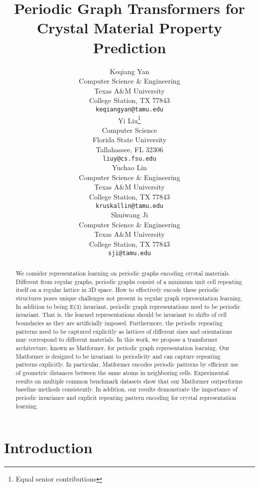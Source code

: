 \documentclass{article}
\title{Periodic Graph Transformers for Crystal Material Property Prediction}
\author{Keqiang Yan \\
 Computer Science \& Engineering\\
  Texas A\&M University\\
  College Station, TX 77843 \\
  \texttt{keqiangyan@tamu.edu} \\
  \And
  Yi Liu\thanks{Equal senior contributions} \\
  ~~~~~~~~~~~~~Computer Science~~~~~~~~~~~~~\\
  Florida State University\\
  Tallahassee, FL 32306 \\
  \texttt{liuy@cs.fsu.edu} \\
  \And
  Yuchao Lin \\
  Computer Science \& Engineering\\
  Texas A\&M University\\
  College Station, TX 77843 \\
  \texttt{kruskallin@tamu.edu} \\
  \And
  Shuiwang Ji\footnotemark[1] \\
  Computer Science \& Engineering\\
  Texas A\&M University\\
  College Station, TX 77843 \\
  \texttt{sji@tamu.edu} \\
}
\begin{document}
\maketitle


\begin{abstract}
We consider representation learning on periodic graphs encoding crystal materials. Different from regular graphs, periodic graphs consist of a minimum unit cell repeating itself on a regular lattice in 3D space. How to effectively encode these periodic structures poses unique challenges not present in regular graph representation learning. In addition to being E(3) invariant, periodic graph representations need to be periodic invariant. That is, the learned representations should be invariant to shifts of cell boundaries as they are artificially imposed. Furthermore, the periodic repeating patterns need to be captured explicitly as lattices of different sizes and orientations may correspond to different materials. In this work, we propose a transformer architecture, known as Matformer, for periodic graph representation learning. Our Matformer is designed to be invariant to periodicity and can capture repeating patterns explicitly. In particular, Matformer encodes periodic patterns by efficient use of geometric distances between the same atoms in neighboring cells. Experimental results on multiple common benchmark datasets show that our Matformer outperforms baseline methods consistently. In addition, our results demonstrate the importance of periodic invariance and explicit repeating pattern encoding for crystal representation learning.


\end{abstract}


\section{Introduction}
\end{document}
